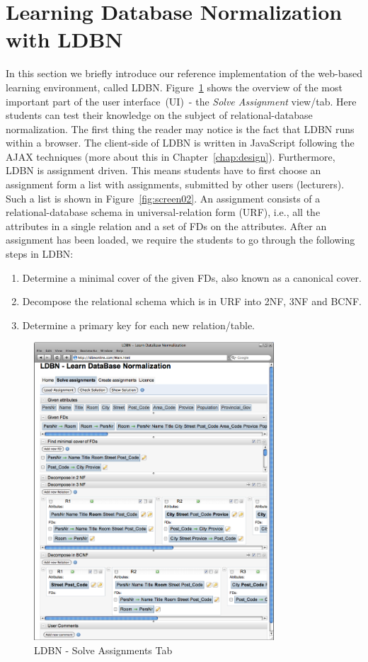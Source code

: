 \section{Learning Database Normalization with LDBN}
\label{sec:introldbn}
In this section we briefly introduce our reference implementation
of the web-based learning environment, called LDBN.    
Figure~\ref{fig:screen01} shows the overview of the most important part of the user interface~(UI)~- 
the \textit{Solve Assignment} view/tab. Here students can test their knowledge on 
the subject of relational-database normalization. The first thing the reader 
may notice is the fact that LDBN runs within a browser. The client-side 
of LDBN is written in JavaScript following the AJAX techniques 
(more about this in Chapter~\ref{chap:design}). 
Furthermore, LDBN is assignment driven. This means students have to first 
choose an assignment 
form a list with assignments, submitted by other users (lecturers). 
Such a list is shown in Figure~\ref{fig:screen02}. 
An assignment consists of a relational-database schema in
universal-relation form (URF), i.e., all the attributes in a single relation 
and a set of FDs on the attributes. 
After an assignment has been loaded, we require the students to go through the 
following steps in LDBN:
\begin{enumerate}
	\item Determine a minimal cover of the given FDs, also known as a canonical cover.
	\item Decompose the relational schema which is in URF into 2NF, 3NF and BCNF. 
	\item Determine a primary key for each new relation/table. 
\end{enumerate}

\begin{figure}[h]
	\begin{center}
		\includegraphics[width=0.8\textwidth]{./img/screen01b.png}
		\caption{LDBN - Solve Assignments Tab}
		\label{fig:screen01}
	\end{center}
\end{figure}

